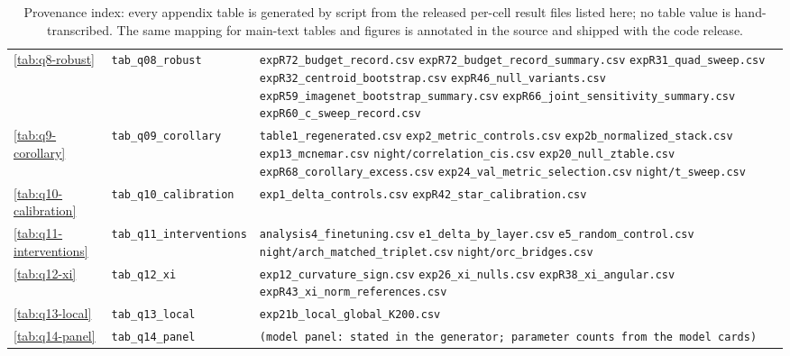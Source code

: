 \begin{table}[H]
\begin{tabular}{ll>{\raggedright\arraybackslash}p{9.0cm}}
\ref{tab:q8-robust} & \texttt{tab\_q08\_robust} & \texttt{expR72\_budget\_record.csv} \texttt{expR72\_budget\_record\_summary.csv} \texttt{expR31\_quad\_sweep.csv} \texttt{expR32\_centroid\_bootstrap.csv} \texttt{expR46\_null\_variants.csv} \texttt{expR59\_imagenet\_bootstrap\_summary.csv} \texttt{expR66\_joint\_sensitivity\_summary.csv} \texttt{expR60\_c\_sweep\_record.csv} \\
\ref{tab:q9-corollary} & \texttt{tab\_q09\_corollary} & \texttt{table1\_regenerated.csv} \texttt{exp2\_metric\_controls.csv} \texttt{exp2b\_normalized\_stack.csv} \texttt{exp13\_mcnemar.csv} \texttt{night/correlation\_cis.csv} \texttt{exp20\_null\_ztable.csv} \texttt{expR68\_corollary\_excess.csv} \texttt{exp24\_val\_metric\_selection.csv} \texttt{night/t\_sweep.csv} \\
\ref{tab:q10-calibration} & \texttt{tab\_q10\_calibration} & \texttt{exp1\_delta\_controls.csv} \texttt{expR42\_star\_calibration.csv} \\
\ref{tab:q11-interventions} & \texttt{tab\_q11\_interventions} & \texttt{analysis4\_finetuning.csv} \texttt{e1\_delta\_by\_layer.csv} \texttt{e5\_random\_control.csv} \texttt{night/arch\_matched\_triplet.csv} \texttt{night/orc\_bridges.csv} \\
\ref{tab:q12-xi} & \texttt{tab\_q12\_xi} & \texttt{exp12\_curvature\_sign.csv} \texttt{exp26\_xi\_nulls.csv} \texttt{expR38\_xi\_angular.csv} \texttt{expR43\_xi\_norm\_references.csv} \\
\ref{tab:q13-local} & \texttt{tab\_q13\_local} & \texttt{exp21b\_local\_global\_K200.csv} \\
\ref{tab:q14-panel} & \texttt{tab\_q14\_panel} & \texttt{(model panel: stated in the generator; parameter counts from the model cards)} \\
\bottomrule
\end{tabular}
\caption{Provenance index: every appendix table is generated by script from the released per-cell result files listed here; no table value is hand-transcribed. The same mapping for main-text tables and figures is annotated in the source and shipped with the code release.}
\label{tab:provenance}
\end{table}
